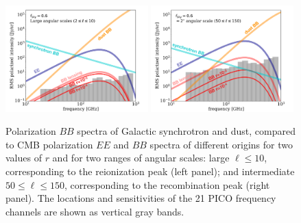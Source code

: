 \documentclass[PICOReport.tex]{subfiles}
\begin{document}

\begin{figure}[ht]
\includegraphics[width=0.49\textwidth]{images/sensitivity_vs_frequency_Dec20_2018_large_scale.pdf}
\includegraphics[width=0.49\textwidth]{images/sensitivity_vs_frequency_Dec20_2018_2deg_scale.pdf}
\vspace{-0.1in}
\caption{\captiontext
Polarization $BB$ spectra of Galactic synchrotron and dust, compared to CMB polarization $EE$ and $BB$ spectra of different origins for two values of $r$ and for two ranges of angular scales: large $\ell \leq 10$, corresponding to the reionization peak (left panel); and intermediate $50 \leq \ell \leq 150$, corresponding to the recombination peak (right panel). The locations and sensitivities of the 21 PICO frequency channels are shown as vertical gray bands. 
\label{fig:pico-channels-and-fg} }
\end{figure}
\end{document}
